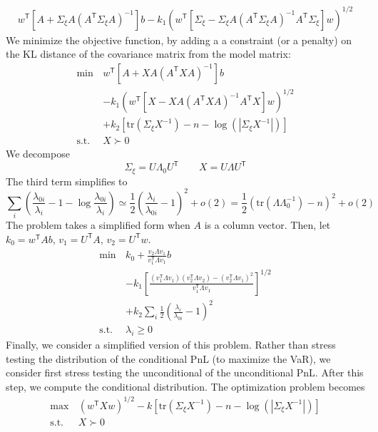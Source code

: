 \documentclass[letter, 12pt]{article}
\newcommand{\transpose}{^\mathsf{T}}
\newcommand{\trace}[1]{{\text{tr}}\left( #1 \right)}
\newcommand{\suchthat}{\text{s.t.}}
\newcommand{\inv}{^{-1}}
\begin{document}
\begin{align*} 
 w\transpose [A + \Sigma_\xi A (A\transpose \Sigma_\xi A)\inv] b - k_1( w\transpose [ \Sigma_\xi - \Sigma_\xi A ( A\transpose \Sigma_\xi A) \inv A\transpose \Sigma_\xi ] w)^{1/2}
\end{align*}
We minimize the objective function, by adding a a constraint (or a penalty) on the KL distance of the covariance matrix from the model matrix:
\begin{align*} 
\min \, & w\transpose [A + X A (A\transpose X  A)\inv] b \\
&- k_1( w\transpose [ X  - X  A ( A\transpose X  A) \inv A\transpose X  ] w)^{1/2} \\
&+ k_2 [\trace{\Sigma_\xi X\inv} -n -\log( |\Sigma_\xi X\inv|)]\\
\suchthat& X \succ 0
\end{align*}
We decompose
$$\Sigma_\xi=U\Lambda_0 U\transpose\qquad X=U\Lambda U\transpose $$
The third term simplifies to
\[
\sum_i \left(
	\frac{\lambda_{0i}}{\lambda_{i}} -1 -\log \frac{\lambda_{0i}}{\lambda_{i}} 
\right) \simeq \frac{1}{2} \left(  \frac{\lambda_{i}}{\lambda_{0i}}-1 \right)^2 + o(2)= \frac{1}{2}\left(\trace{\Lambda \Lambda_0\inv} -n \right)^2 +o(2)
\]
The problem takes a simplified form when $A$ is a column vector. Then, let $k_0= w\transpose A b$, $v_1=U\transpose A$, $v_2=U\transpose w$.
\begin{align*} 
\min \, & k_0+ \frac{v_2  \Lambda v_1}{v_1\transpose \Lambda v_1} b \\
&- k_1\left[\frac{(v_1\transpose \Lambda v_1 )(v_2\transpose \Lambda v_2)- (v_2\transpose \Lambda v_1)^2}{ v_1\transpose \Lambda v_1} \right]^{1/2} \\
&+ k_2 \sum_i \frac{1}{2}\left( \frac{\lambda_{i}}{\lambda_{0i}}-1 \right)^2  \\
\suchthat& \lambda_i \ge 0
\end{align*}
Finally, we consider a simplified version of this problem. Rather than stress testing the distribution of the conditional PnL (to maximize the VaR), we consider first stress testing the unconditional of the unconditional PnL. After this step, we compute the conditional distribution. The optimization problem becomes
\begin{align*} 
\max \, & ( w\transpose  X   w)^{1/2}  - k [\trace{\Sigma_\xi X\inv} -n -\log( |\Sigma_\xi X\inv|)]\\
\suchthat& X \succ 0
\end{align*}
\end{document}

